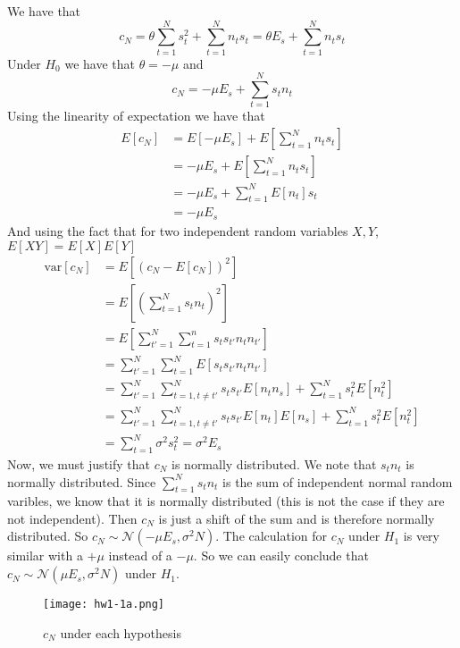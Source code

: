 \documentclass[a4paper]{article}
\begin{document}
We have that
\[
  c_N = \theta \sum_{t=1}^N s_t^2 + \sum_{t=1}^N n_ts_t = \theta E_s + \sum_{t=1}^N n_ts_t
\]
Under $H_0$ we have that $\theta = -\mu$ and 
\[
  c_N = -\mu  E_s + \sum_{t=1}^N s_tn_t
\]
Using the linearity of expectation we have that
\[
  \begin{aligned}
    E[c_N] &= E[-\mu E_s] + E \left[ \sum_{t=1}^N n_ts_t \right]\\
    &= -\mu E_s + E \left[ \sum_{t=1}^N n_ts_t \right]\\
    &= -\mu E_s + \sum_{t=1}^N E[n_t]s_t\\
    &= -\mu E_s
  \end{aligned}
\]
And using the fact that for two independent random variables $X,Y$, $E[XY] = E[X]E[Y]$
\[
  \begin{aligned}
    \text{var} [c_N] &= E \left[ \left( c_N - E[c_N] \right)^2 \right] \\
                     &= E \left[ \left( \sum_{t=1}^N s_tn_t \right)^2 \right] \\
                     &= E \left[ \sum_{t' = 1}^N \sum_{t = 1}^n s_ts_{t'} n_t n_{t'} \right] \\
                     &= \sum_{t' = 1}^N \sum_{t = 1}^N E[s_ts_{t'}n_tn_{t'}] \\
                     &= \sum_{t' = 1}^N \sum_{t=1, t \neq t'}^N s_ts_{t'}E[n_tn_s] + \sum_{t=1}^N s_t^2E[n_t^2] \\
                     &= \sum_{t' = 1}^N \sum_{t=1, t \neq t'}^N s_ts_{t'}E[n_t]E[n_s] + \sum_{t=1}^N s_t^2E[n_t^2] \\
                     &= \sum_{t=1}^N \sigma^2s_t^2 = \sigma^2 E_s
  \end{aligned}
\]
Now, we must justify that $c_N$ is normally distributed. We note that $s_tn_t$ is normally distributed. Since $\sum_{t=1}^N s_tn_t$ is the sum of independent normal random varibles, we know that it is normally distributed (this is not the case if they are not independent). Then $c_N$ is just a shift of the sum and is therefore normally distributed. So $c_N \sim \mathcal{N}(-\mu E_s, \sigma^2N)$. The calculation for $c_N$ under $H_1$ is very similar with a $+\mu$ instead of a $-\mu$. So we can easily conclude that $c_N \sim \mathcal{N}(\mu E_s, \sigma^2N)$ under $H_1$.

\begin{figure}[H]
\begin{center}
  \texttt{[image: hw1-1a.png]}
\end{center}
\caption{$c_N$ under each hypothesis}
\end{figure}
\end{document}
